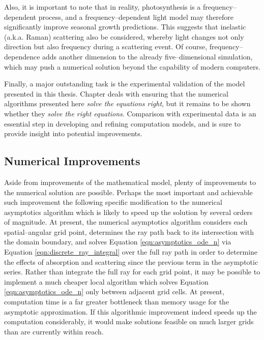 Also, it is important to note that in reality, photosynthesis is a frequency--dependent process, and a frequency--dependent light model may therefore significantly improve seasonal growth predictions.
This suggests that inelastic (a.k.a. Raman) scattering also be considered, whereby light changes not only direction but also frequency during a scattering event.
Of course, frequency--dependence adds another dimension to the already five--dimensional simulation, which may push a numerical solution beyond the capability of modern computers.

Finally, a major outstanding task is the experimental validation of the model presented in this thesis.
Chapter \Rom{\ref{chap:model_analysis}} deals with ensuring that the numerical algorithms presented here \textit{solve the equations right}, but it remains to be shown whether they \textit{solve the right equations}.
Comparison with experimental data is an essential step in developing and refining computation models, and is sure to provide insight into potential improvements.

\subsection{Numerical Improvements}
Aside from improvements of the mathematical model, plenty of improvements to the numerical solution are possible.
Perhaps the most important and achievable such improvement the following specific modification to the numerical asymptotics algorithm which is likely to speed up the solution by several orders of magnitude.
At present, the numerical asymptotics algorithm considers each spatial--angular grid point, determines the ray path back to its intersection with the domain boundary, and solves Equation \eqref{eqn:asymptotics_ode_n} via Equation \eqref{eqn:discrete_ray_integral} over the full ray path in order to determine the effects of absorption and scattering since the previous term in the asymptotic series.
Rather than integrate the full ray for each grid point, it may be possible to implement a much cheaper local algorithm which solves Equation \eqref{eqn:asymptotics_ode_n} only between adjacent grid cells.
At present, computation time is a far greater bottleneck than memory usage for the asymptotic approximation.
If this algorithmic improvement indeed speeds up the computation considerably, it would make solutions feasible on much larger grids than are currently within reach.

